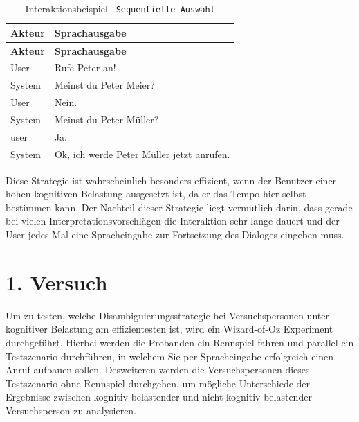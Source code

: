 \documentclass[12pt,a4paper]{scrartcl}
\begin{document}
\begin{longtable}{p{6cm}p{8cm}}
	\caption[Interaktionsbeispiel \texttt{Sequentielle Auswahl}]{Interaktionsbeispiel \texttt{ Sequentielle Auswahl}}\\
	\hline
	\textbf{Akteur} &	\textbf{Sprachausgabe}\\
	\hline
	\endfirsthead
	\hline
	\textbf{Akteur} &	\textbf{Sprachausgabe}\\
	\hline
	\endhead
User & Rufe Peter an!\\
System & Meinst du Peter Meier?\\
User & Nein.\\
System & Meinst du Peter Müller?\\
user & Ja.\\
System & Ok, ich werde Peter Müller jetzt anrufen.\\

\hline
\end{longtable}

Diese Strategie ist wahrscheinlich besonders effizient, wenn der Benutzer einer hohen kognitiven Belastung ausgesetzt ist, da er das Tempo hier selbst bestimmen kann. Der Nachteil dieser Strategie liegt vermutlich darin, dass gerade bei vielen Interpretationsvorschlägen die Interaktion sehr lange dauert und der User jedes Mal eine Spracheingabe zur Fortsetzung des Dialoges eingeben muss. 

\section{1. Versuch}
Um zu testen, welche Disambiguierungsstrategie bei Versuchspersonen unter kognitiver Belastung am effizientesten ist, wird ein Wizard-of-Oz Experiment durchgeführt. Hierbei werden die Probanden ein Rennspiel fahren und parallel ein Testszenario durchführen, in welchem Sie per Spracheingabe erfolgreich einen Anruf aufbauen sollen. Desweiteren werden die Versuchspersonen dieses Testszenario ohne Rennspiel durchgehen, um mögliche Unterschiede der Ergebnisse zwischen kognitiv belastender und nicht kognitiv belastender Versuchsperson zu analysieren. 
\end{document}
